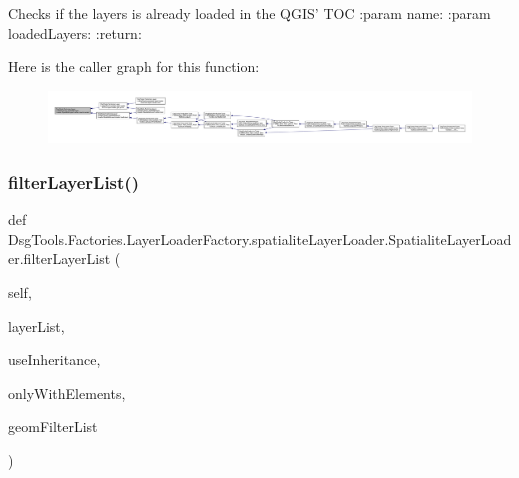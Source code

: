 \begin{DoxyVerb}Checks if the layers is already loaded in the QGIS' TOC
:param name: 
:param loadedLayers: 
:return:
\end{DoxyVerb}
 Here is the caller graph for this function\+:
\nopagebreak
\begin{figure}[H]
\begin{center}
\leavevmode
\includegraphics[width=350pt]{class_dsg_tools_1_1_factories_1_1_layer_loader_factory_1_1spatialite_layer_loader_1_1_spatialite_layer_loader_a4ae1129ae8af2875c36dd1b256d2dd54_icgraph}
\end{center}
\end{figure}
\mbox{\label{class_dsg_tools_1_1_factories_1_1_layer_loader_factory_1_1spatialite_layer_loader_1_1_spatialite_layer_loader_aad3c3df9e70822f96bef5e08491c762c}} 
\subsubsection{\texorpdfstring{filter\+Layer\+List()}{filterLayerList()}}
{\footnotesize\ttfamily def Dsg\+Tools.\+Factories.\+Layer\+Loader\+Factory.\+spatialite\+Layer\+Loader.\+Spatialite\+Layer\+Loader.\+filter\+Layer\+List (\begin{DoxyParamCaption}\item[{}]{self,  }\item[{}]{layer\+List,  }\item[{}]{use\+Inheritance,  }\item[{}]{only\+With\+Elements,  }\item[{}]{geom\+Filter\+List }\end{DoxyParamCaption})}

